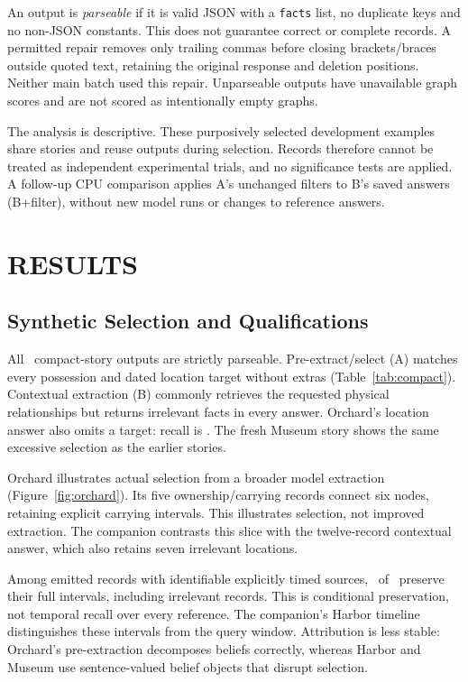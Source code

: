 \documentclass[a4paper,twoside]{article}
\begin{document}
An output is \emph{parseable} if it is valid JSON with a \texttt{facts} list, no duplicate keys and no non-JSON constants. This does not guarantee correct or complete records. A permitted repair removes only trailing commas before closing brackets/braces outside quoted text, retaining the original response and deletion positions. Neither main batch used this repair. Unparseable outputs have unavailable graph scores and are not scored as intentionally empty graphs.

The analysis is descriptive. These purposively selected development examples share stories and reuse outputs during selection. Records therefore cannot be treated as independent experimental trials, and no significance tests are applied. A follow-up CPU comparison applies A's unchanged filters to B's saved answers (B+filter), without new model runs or changes to reference answers.

\AliceFigure






\section{\uppercase{Results}}

\subsection{Synthetic Selection and Qualifications}
\noindent All \CompactCalls\ compact-story outputs are strictly parseable. Pre-extract/select (A) matches every possession and dated location target without extras (Table~\ref{tab:compact}). Contextual extraction (B) commonly retrieves the requested physical relationships but returns irrelevant facts in every answer. Orchard's location answer also omits a target: recall is \OrchardLocationRecall. The fresh Museum story shows the same excessive selection as the earlier stories.



Orchard illustrates actual selection from a broader model extraction (Figure~\ref{fig:orchard}). Its five ownership/carrying records connect six nodes, retaining explicit carrying intervals. This illustrates selection, not improved extraction. The companion contrasts this slice with the twelve-record contextual answer, which also retains seven irrelevant locations.

Among emitted records with identifiable explicitly timed sources, \IntervalsKept\ of \IntervalsEligible\ preserve their full intervals, including irrelevant records. This is conditional preservation, not temporal recall over every reference. The companion's Harbor timeline distinguishes these intervals from the query window. Attribution is less stable: Orchard's pre-extraction decomposes beliefs correctly, whereas Harbor and Museum use sentence-valued belief objects that disrupt selection.
\end{document}
